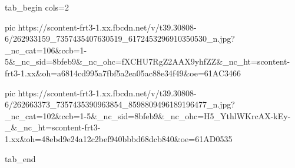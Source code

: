  
 
 
 
 


\ifcmt
  tab_begin cols=2

     pic https://scontent-frt3-1.xx.fbcdn.net/v/t39.30808-6/262933159_7357435407630519_6172453296910350530_n.jpg?_nc_cat=106&ccb=1-5&_nc_sid=8bfeb9&_nc_ohc=fXCHU7RgZ2AAX9yhfZZ&_nc_ht=scontent-frt3-1.xx&oh=a6814cd995a7fbf5a2ea05ac88e34f49&oe=61AC3466

     pic https://scontent-frt3-1.xx.fbcdn.net/v/t39.30808-6/262663373_7357435390963854_8598809496189196477_n.jpg?_nc_cat=102&ccb=1-5&_nc_sid=8bfeb9&_nc_ohc=H5_YthlWKrcAX-kEy-_&_nc_ht=scontent-frt3-1.xx&oh=48ebd9e24a12c2bef940bbbd68dcb840&oe=61AD0535

  tab_end
\fi
